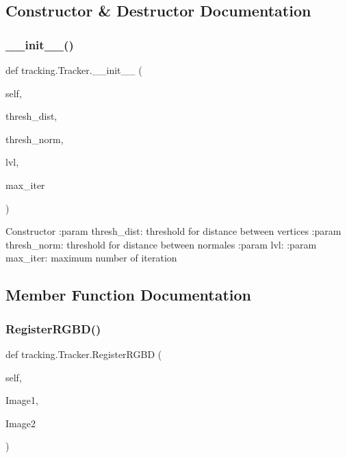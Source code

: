 \subsection{Constructor \& Destructor Documentation}
\mbox{\label{classtracking_1_1_tracker_af4ec0591320a6a3186198e4afa34aa4a}} 
\subsubsection{\+\_\+\+\_\+init\+\_\+\+\_\+()}
{\footnotesize\ttfamily def tracking.\+Tracker.\+\_\+\+\_\+init\+\_\+\+\_\+ (\begin{DoxyParamCaption}\item[{}]{self,  }\item[{}]{thresh\+\_\+dist,  }\item[{}]{thresh\+\_\+norm,  }\item[{}]{lvl,  }\item[{}]{max\+\_\+iter }\end{DoxyParamCaption})}

\begin{DoxyVerb}Constructor
:param thresh_dist: threshold for distance between vertices
:param thresh_norm: threshold for distance between normales
:param lvl:
:param max_iter: maximum number of iteration
\end{DoxyVerb}
 

\subsection{Member Function Documentation}
\mbox{\label{classtracking_1_1_tracker_a74ff598370a1334ee1cf35a1d8c3c5b8}} 
\subsubsection{Register\+R\+G\+B\+D()}
{\footnotesize\ttfamily def tracking.\+Tracker.\+Register\+R\+G\+BD (\begin{DoxyParamCaption}\item[{}]{self,  }\item[{}]{Image1,  }\item[{}]{Image2 }\end{DoxyParamCaption})}

